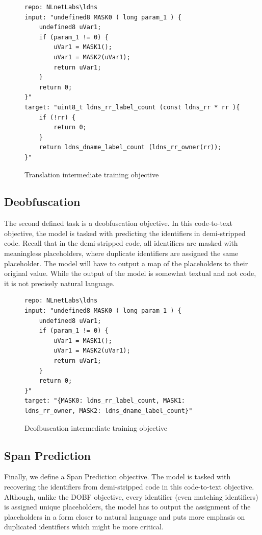 \begin{figure}[H]
  \centering
\begin{lstlisting}
repo: NLnetLabs\ldns
input: "undefined8 MASK0 ( long param_1 ) { 
    undefined8 uVar1; 
    if (param_1 != 0) { 
        uVar1 = MASK1(); 
        uVar1 = MASK2(uVar1); 
        return uVar1; 
    } 
    return 0; 
}"
target: "uint8_t ldns_rr_label_count (const ldns_rr * rr ){ 
    if (!rr) { 
        return 0;
    } 
    return ldns_dname_label_count (ldns_rr_owner(rr));
}"
\end{lstlisting}
  \caption{Translation intermediate training objective}
  \label{fig:tanslation}
\end{figure}

\subsection{Deobfuscation}
The second defined task is a deobfuscation objective. In this code-to-text objective, the model is tasked with predicting the identifiers in demi-stripped code. Recall that in the demi-stripped code, all identifiers are masked with meaningless placeholders, where duplicate identifiers are assigned the same placeholder. The model will have to output a map of the placeholders to their original value. While the output of the model is somewhat textual and not code, it is not precisely natural language.

\begin{figure}[H]
  \centering
\begin{lstlisting}
repo: NLnetLabs\ldns
input: "undefined8 MASK0 ( long param_1 ) { 
    undefined8 uVar1; 
    if (param_1 != 0) { 
        uVar1 = MASK1(); 
        uVar1 = MASK2(uVar1); 
        return uVar1; 
    } 
    return 0; 
}"
target: "{MASK0: ldns_rr_label_count, MASK1:
ldns_rr_owner, MASK2: ldns_dname_label_count}"
\end{lstlisting}
  \caption{Deofbuscation intermediate training objective}
  \label{fig:dobf}
\end{figure}


\subsection{Span Prediction}
Finally, we define a Span Prediction objective. The model is tasked with recovering the identifiers from demi-stripped code in this code-to-text objective. Although, unlike the DOBF objective, every identifier (even matching identifiers) is assigned unique placeholders, the model has to output the assignment of the placeholders in a form closer to natural language and puts more emphasis on duplicated identifiers which might be more critical.


